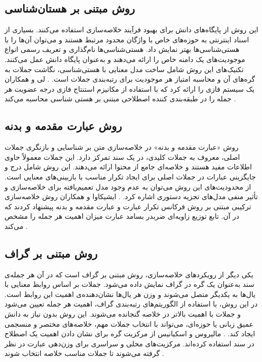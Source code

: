 \subsection{روش مبتنی بر هستان‌شناسی}
این روش از پایگاه‌های دانش برای بهبود فرآیند خلاصه‌سازی استفاده می‌کنند. بسیاری از اسناد اینترنتی به حوزه‌های خاص با واژگان محدود مرتبط هستند و می‌توان آن‌ها را با هستی‌شناسی‌ها بهتر نمایش داد. هستی‌شناسی‌ها نام‌گذاری و تعریف رسمی انواع موجودیت‌های یک دامنه خاص را ارائه می‌دهند و به‌عنوان پایگاه دانش عمل می‌کنند. 
تکنیک‌های این روش شامل ساخت مدل معنایی با هستی‌شناسی، نگاشت جملات به گره‌های آن و محاسبه امتیاز هر موجودیت برای رتبه‌بندی جملات است.
\cite{andhale2016overview}.
لی و همکاران یک سیستم فازی را ارائه کرد که با استفاده از مکانیزم استنتاج فازی درجه عضویت هر جمله را در طبقه‌بندی کننده اصطلاحی مبتنی بر هستی شناسی محاسبه می‌کند
\cite{lee2005fuzzy}.

\subsection{روش عبارت مقدمه و بدنه}

روش «عبارت مقدمه و بدنه» در خلاصه‌سازی متن بر شناسایی و بازنگری جملات اصلی، معروف به جملات کلیدی، در یک سند تمرکز دارد. این جملات معمولاً حاوی اطلاعات مفید هستند و خلاصه‌ای جامع از محتوا ارائه می‌دهند. این روش شامل درج و جایگزینی عبارات در جملات اصلی برای ایجاد تکرار مناسب با بازبینی‌های معنایی است. از محدودیت‌های این روش می‌توان به عدم وجود مدل تعمیم‌یافته برای خلاصه‌سازی و تأثیر منفی مدل‌های تجزیه دستوری اشاره کرد.
\cite{andhale2016overview}.
ایشیکاوا و همکاران روش خلاصه‌سازی ترکیبی مبتنی بر روش فرکانس تکرار عبارت
و عبارت مقدمه و بدنه پیشنهاد کردند که در آن. تابع توزیع زاویه‌ای ضربدر بسامد عبارت میزان اهمیت هر جمله را مشخص می‌کند
\cite{Ishikawa2001HybridTS}.

\subsection{روش مبتنی بر گراف}
یکی دیگر از رویکردهای خلاصه‌سازی، روش مبتنی بر گراف است که در آن هر جمله‌ی سند به‌عنوان یک گره در گراف نمایش داده می‌شود. جملات بر اساس روابط معنایی با یال‌ها به یکدیگر متصل می‌شوند و وزن هر یال‌ها نشان‌دهنده‌ی اهمیت این روابط است. در این روش، با استفاده از الگوریتم‌های رتبه‌بندی گراف، اهمیت هر جمله تعیین می‌شود و جملات با اهمیت بالاتر در خلاصه گنجانده می‌شوند. این روش بدون نیاز به دانش عمیق زبانی یا حوزه‌ای، می‌تواند با انتخاب جملات مهم، خلاصه‌های مختصر و منسجمی ایجاد کند.
\cite{andhale2016overview}.
مالیروس و اسکیانیس از مرکزیت گره برای نشان دادن اهمیت یک اصطلاح در سند استفاده کرده‌اند. مرکزیت‌های محلی و سراسری برای وزن‌دهی عبارت در نظر گرفته می‌شوند تا جملات مناسب خلاصه انتخاب شوند
\cite{GraphBased}.
